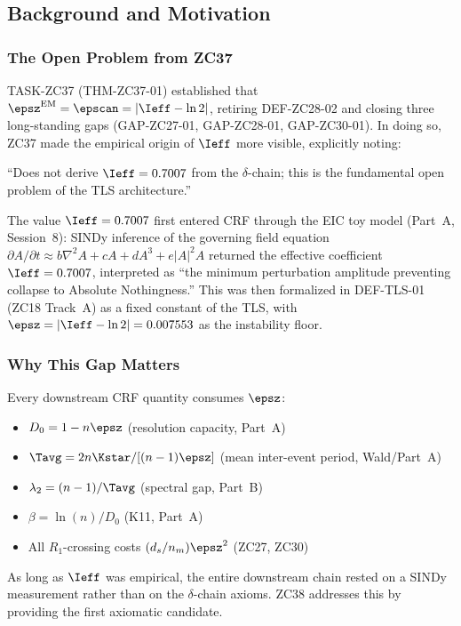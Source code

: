 \documentclass[12pt, a4paper]{article}
\begin{document}
\subsection{Background and Motivation}
\label{sec:background}

\subsubsection{The Open Problem from ZC37}

TASK-ZC37 (THM-ZC37-01) established that
$\epsz^{\rm EM} = \epscan = |\Ieff - \ln 2|$,
retiring DEF-ZC28-02 and closing three long-standing gaps
(GAP-ZC27-01, GAP-ZC28-01, GAP-ZC30-01).
In doing so, ZC37 made the empirical origin of $\Ieff$ more visible,
explicitly noting:

\begin{openqbox}[title={Inherited open problem from ZC37}]
``Does not derive $\Ieff = 0.7007$ from the $\delta$-chain;
this is the fundamental open problem of the TLS architecture.''
\end{openqbox}

\noindent
The value $\Ieff = 0.7007$ first entered CRF through the EIC toy model
(Part~A, Session~8): SINDy inference of the governing field equation
$\partial A/\partial t \approx b\nabla^2 A + cA + dA^3 + e|A|^2 A$
returned the effective coefficient $\Ieff = 0.7007$, interpreted as
``the minimum perturbation amplitude preventing collapse to Absolute Nothingness.''
This was then formalized in DEF-TLS-01 (ZC18 Track~A) as a fixed
constant of the TLS, with $\epsz = |\Ieff - \ln 2| = 0.007553$
as the instability floor.

\subsubsection{Why This Gap Matters}

Every downstream CRF quantity consumes $\epsz$:
\begin{itemize}[leftmargin=*,noitemsep]
  \item $D_0 = 1 - n\epsz$ (resolution capacity, Part~A)
  \item $\Tavg = 2n\Kstar/[(n-1)\epsz]$ (mean inter-event period, Wald/Part~A)
  \item $\lambda_2 = (n-1)/\Tavg$ (spectral gap, Part~B)
  \item $\beta = \ln(n)/D_0$ (K11, Part~A)
  \item All $R_1$-crossing costs $(d_s/n_m)\epsz^2$ (ZC27, ZC30)
\end{itemize}
\noindent
As long as $\Ieff$ was empirical, the entire downstream chain rested
on a SINDy measurement rather than on the $\delta$-chain axioms.
ZC38 addresses this by providing the first axiomatic candidate.
\end{document}
